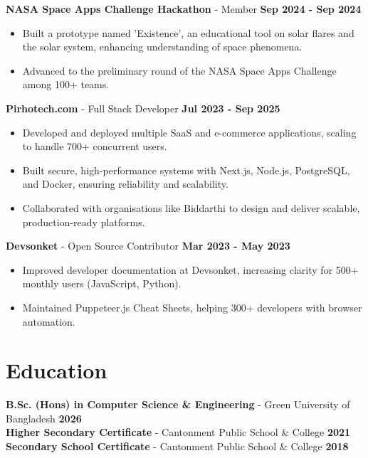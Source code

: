 \documentclass[11pt,a4paper]{article}
\newcommand{\expentry}[3]{%
  \vspace{4pt}%
  \noindent\textbf{#1} - #2 \hfill \textbf{#3}\\[-2pt]%
}
\begin{document}
\expentry{NASA Space Apps Challenge Hackathon}{Member}{Sep 2024 - Sep 2024}
\begin{itemize}
  \item Built a prototype named 'Existence', an educational tool on solar flares and the solar system, enhancing understanding of space phenomena.
  \item Advanced to the preliminary round of the NASA Space Apps Challenge among 100+ teams.
\end{itemize}

\expentry{Pirhotech.com}{Full Stack Developer}{Jul 2023 - Sep 2025}
\begin{itemize}
  \item Developed and deployed multiple SaaS and e-commerce applications, scaling to handle 700+ concurrent users.
  \item Built secure, high-performance systems with Next.js, Node.js, PostgreSQL, and Docker, ensuring reliability and scalability.
  \item Collaborated with organisations like Biddarthi to design and deliver scalable, production-ready platforms.
\end{itemize}

\expentry{Devsonket}{Open Source Contributor}{Mar 2023 - May 2023}
\begin{itemize}
  \item Improved developer documentation at Devsonket, increasing clarity for 500+ monthly users (JavaScript, Python).
  \item Maintained Puppeteer.js Cheat Sheets, helping 300+ developers with browser automation.
\end{itemize}


\section{Education}
\textbf{B.Sc. (Hons) in Computer Science \& Engineering} - Green University of Bangladesh \hfill \textbf{2026}\\[2pt]
\textbf{Higher Secondary Certificate} - Cantonment Public School \& College \hfill \textbf{2021}\\[2pt]
\textbf{Secondary School Certificate} - Cantonment Public School \& College \hfill \textbf{2018}\\[2pt]


\end{document}
